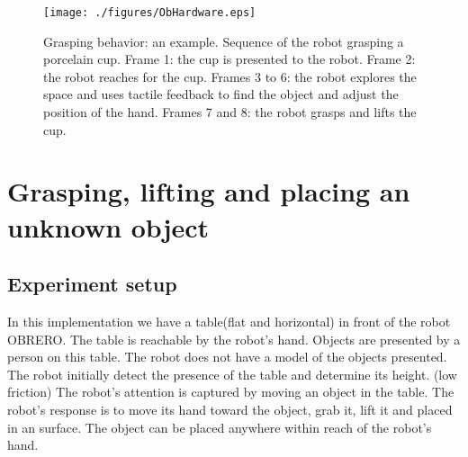 


%

\begin{figure}[htbp]
\centerline{
\texttt{[image: ./figures/ObHardware.eps]}
} \caption[An example of the Grasping Behavior]{Grasping behavior:
an example. Sequence of the robot grasping a porcelain cup. Frame
1: the cup is presented to the robot. Frame 2: the robot reaches
for the cup. Frames 3 to 6: the robot explores the space and uses
tactile feedback to find the object and adjust the position of the
hand. Frames 7 and 8: the robot grasps and lifts the cup.}
\label{fig:ObHardware}
\end{figure}

\section{Grasping, lifting and placing an unknown object}
\label{sec:controlling}
%
\subsection{Experiment setup} In this implementation we have a
table(flat and horizontal) in front of the robot OBRERO. The table
is reachable by the robot's hand. Objects are presented by a
person on this table. The robot does not have a model of the
objects presented.
%
The robot initially detect the presence of the table and determine
its height. (low friction)
%
The robot's attention is captured by moving an object in the
table. The robot's response is to move its hand toward the object,
grab it, lift it and placed in an surface.
%
The object can be placed anywhere within reach of the robot's
hand.
%


